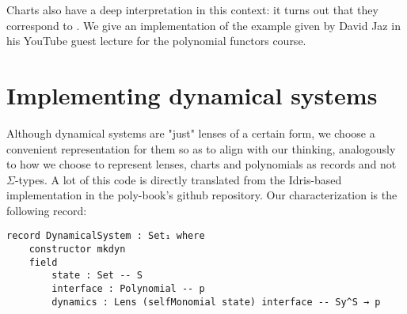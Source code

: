 Charts also have a deep interpretation in this context: it turns out that they correspond to . We give an implementation of the example given by David Jaz in his YouTube guest lecture for the polynomial functors course.

\section{Implementing dynamical systems}

Although dynamical systems are "just" lenses of a certain form, we choose a convenient representation for them so as to align with our thinking, analogously to how we choose to represent lenses, charts and polynomials as records and not $\Sigma$-types. A lot of this code is directly translated from the Idris-based implementation in the poly-book's github repository. Our characterization is the following record:
\begin{verbatim}
record DynamicalSystem : Set₁ where
    constructor mkdyn
    field
        state : Set -- S
        interface : Polynomial -- p
        dynamics : Lens (selfMonomial state) interface -- Sy^S → p
\end{verbatim}

